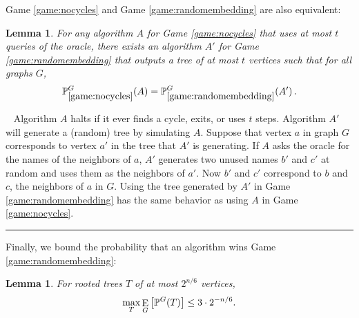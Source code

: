 \documentclass[aps,11pt,twoside,nofootinbib,tightenlines,superscriptaddress,preprintnumbers]{revtex4}
\newcommand{\<}{\langle}
\renewcommand{\>}{\rangle}
\newcommand{\be}{\begin{equation}}
\newcommand{\ee}{\end{equation}}
\newcommand\symExpec{\mathop{\mathrm{E}}\displaylimits}
\def\expec#1#2{\symExpec_{#1}\left[ #2 \right]}
\newtheorem{lemma}[theorem]{Lemma}
\newcommand{\qed}{\rule{7pt}{7pt}}
\newenvironment{proof}
  {\trivlist\item\noindent{\bf Proof}~}
  {\qed\endtrivlist}
\begin{document}
\noindent
Game \ref{game:nocycles} and Game \ref{game:randomembedding} are also
equivalent:

\begin{lemma}\label{lem:equivalence}
For any algorithm $A$ for Game \ref{game:nocycles} that uses at most $t$
queries of the oracle, there exists an algorithm $A'$ for Game
\ref{game:randomembedding} that outputs a tree of at most $t$ vertices
such that for all graphs $G$,
\be
    \mathbb{P}^{G}_{\ref{game:nocycles}}(A) 
  = \mathbb{P}^{G}_{\ref{game:randomembedding}}(A')
\,.
\ee
\end{lemma}

\begin{proof}
Algorithm $A$ halts if it ever finds a cycle, exits, or uses $t$ steps.
Algorithm $A'$ will generate a (random) tree by simulating $A$.  Suppose
that vertex $a$ in graph $G$ corresponds to vertex $a'$ in the tree that
$A'$ is generating.  If $A$ asks the oracle for the names of the neighbors
of $a$, $A'$ generates two unused names $b'$ and $c'$ at random and uses
them as the neighbors of $a'$.  Now $b'$ and $c'$ correspond to $b$ and
$c$, the neighbors of $a$ in $G$.  Using the tree generated by $A'$ in
Game \ref{game:randomembedding} has the same behavior as using $A$ in Game
\ref{game:nocycles}.
\end{proof}

Finally, we bound the probability that an algorithm wins Game
\ref{game:randomembedding}:

\begin{lemma}\label{lem:ourGraphs}
For rooted trees $T$ of at most $2^{n/6}$ vertices,
\be
 \max_{T}
  \expec{G}{\mathbb{P}^G(T)}
  \leq 3 \cdot 2^{-n/6}.
\ee
\end{lemma}
\end{document}
